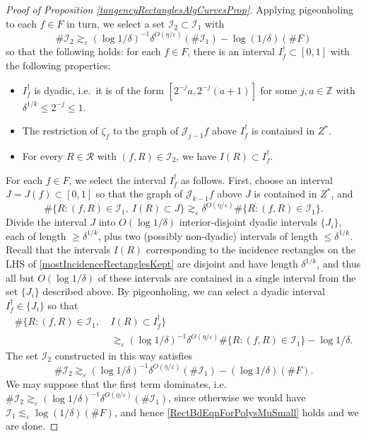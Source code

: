 \documentclass[letterpaper, reqno,11pt]{article}
\numberwithin{equation}{section}
\newcommand{\ZZ}{\mathbb{Z}}
\newcommand{\eps}{\varepsilon}
\numberwithin{thm}{section}
\theoremstyle{remark}
\begin{document}
\begin{proof}[Proof of Proposition \ref{tangencyRectanglesAlgCurvesProp}]
Applying pigeonholing to each $f\in F$ in turn, we select a set $\mathcal{I}_2\subset\mathcal{I}_1$ with 
\[
\#\mathcal{I}_2\gtrsim_\eps (\log 1/\delta)^{-1}\delta^{O(\eta/\eps)}(\#\mathcal{I}_1)-\log(1/\delta)(\#F)
\]
so that the following holds: for each $f\in F$, there is an interval $I_f^\dag\subset[0,1]$ with the following properties:
\begin{itemize}
	\item $I_f^\dag$ is dyadic, i.e.~it is of the form $[2^{-j}a, 2^{-j}(a+1)]$ for some $j,a\in\ZZ$ with $\delta^{1/k}\leq 2^{-j} \leq 1$.
	\item The restriction of $\zeta_f$ to the graph of $\mathcal{J}_{j-1}f$ above $I_f^\dag$ is contained in $Z^*$.
	\item For every $R\in\mathcal{R}$ with $(f,R)\in \mathcal{I}_2$, we have $I(R)\subset I_f^\dag.$
\end{itemize}
For each $f\in F$, we select the interval $I_f^\dag$ as follows. First, choose an interval $J=J(f)\subset[0,1]$ so that the graph of $\mathcal{J}_{k-1}f$ above $J$ is contained in $Z^*$, and 
\begin{equation}\label{mostIncidenceRectanglesKept}
\#\{R\colon (f,R)\in \mathcal{I}_1,\ I(R)\subset J\}\gtrsim_\eps \delta^{O(\eta/\eps)}\#\{R\colon (f,R)\in \mathcal{I}_1\}.
\end{equation}
Divide the interval $J$ into $O(\log 1/\delta)$ interior-disjoint dyadic intervals $\{J_i\}$, each of length $\geq \delta^{1/k}$, plus two (possibly non-dyadic) intervals of length $\leq \delta^{1/k}$. Recall that the intervals $I(R)$ corresponding to the incidence rectangles on the LHS of \eqref{mostIncidenceRectanglesKept} are disjoint and have length $\delta^{1/k}$, and thus all but $O(\log 1/\delta)$ of these intervals are contained in a single interval from the set $\{J_i\}$ described above. By pigeonholing, we can select a dyadic interval $I_f^\dag \in \{J_i\}$ so that
\begin{equation*}
\begin{split}
\#\{R\colon (f,R)\in \mathcal{I}_1,\ & I(R)\subset I_f^\dag \}\\
&\gtrsim_\eps (\log 1/\delta)^{-1}\delta^{O(\eta/\eps)}\#\{R\colon (f,R)\in \mathcal{I}_1\}-\log 1/\delta.
\end{split}
\end{equation*}
%
The set $\mathcal{I}_2$ constructed in this way satisfies 
\[
\#\mathcal{I}_2\gtrsim_\eps (\log 1/\delta)^{-1}\delta^{O(\eta/\eps)}(\#\mathcal{I}_1) - (\log 1/\delta)(\# F).
\]
We may suppose that the first term dominates, i.e.~$\#\mathcal{I}_2\gtrsim_\eps (\log 1/\delta)^{-1}\delta^{O(\eta/\eps)}(\#\mathcal{I}_1)$, since otherwise we would have $\mathcal{I}_1\lesssim_\eps \log(1/\delta)(\#F)$, and hence \eqref{RectBdEqnForPolysMuSmall} holds and we are done.



\end{proof}
\end{document}
